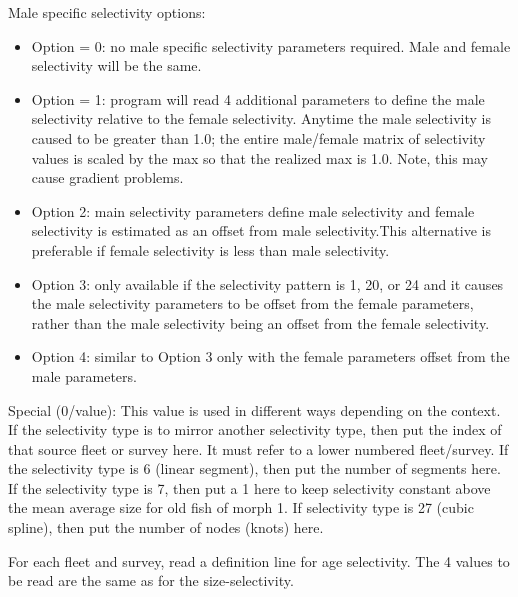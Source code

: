 Male specific selectivity options:
\begin{itemize}
	\item Option = 0: no male specific selectivity parameters required. Male and female selectivity will be the same.
	\item Option = 1: program will read 4 additional parameters to define the male selectivity relative to the female selectivity. Anytime the male selectivity is caused to be greater than 1.0; the entire male/female matrix of selectivity values is scaled by the max so that the realized max is 1.0. Note, this may cause gradient problems.
	\item Option 2: main selectivity parameters define male selectivity and female selectivity is estimated as an offset from male selectivity.This alternative is preferable if female selectivity is less than male selectivity.
	\item Option 3: only available if the selectivity pattern is 1, 20, or 24 and it causes the male selectivity parameters to be offset from the female parameters, rather than the male selectivity being an offset from the female selectivity.
	\item Option 4: similar to Option 3 only with the female parameters offset from the male parameters.
\end{itemize}

Special (0/value): This value is used in different ways depending on the context. If the selectivity type is to mirror another selectivity type, then put the index of that source fleet or survey here. It must refer to a lower numbered fleet/survey. If the selectivity type is 6 (linear segment), then put the number of segments here. If the selectivity type is 7, then put a 1 here to keep selectivity constant above the mean average size for old fish of morph 1. If selectivity type is 27 (cubic spline), then put the number of nodes (knots) here.

For each fleet and survey, read a definition line for age selectivity. The 4 values to be read are the same as for the size-selectivity. 

